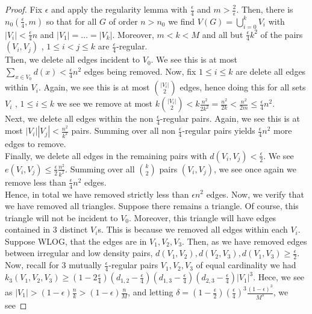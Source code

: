 \begin{proof}
	Fix \(\epsilon\) and apply the regularity lemma with \(\frac{\epsilon}{4}\) and \(m > \frac{2}{\epsilon}\). Then, there is \(n_0 \left( \frac{\epsilon}{4}, m \right) \) so that for all \(G\) of order \(n > n_0\)  we find \(V\left( G \right) = \bigcup_{i=0} ^{k} V_{i}\) with \(\left| V_{i} \right|< \frac{\epsilon}{4}n \) and \(\left| V_1 \right|  = \ldots = \left| V_{k} \right| \). Moreover, \(m < k < M\) and all but \(\frac{\epsilon}{4} k^2\) of the pairs \(\left( V_{i}, V_{j} \right) \) , \(1 \le i < j \le k\) are \(\frac{\epsilon}{4}\)-regular.\\
	Then, we delete all edges incident to \(V_0\). We see this is at most \(\sum_{x \in V_0}^{}d\left( x \right) < \frac{\epsilon}{4}n^2\) edges being removed. Now, fix \(1 \le i \le k\) are delete all edges within \(V_{i}\). Again, we see this is at most \( \binom{\left| V_{i} \right| }{2}\) edges, hence doing this for all sets \(V_{i}\) , \(1 \le i \le k\) we see we remove at most \(k \binom{\left| V_{i} \right| }{2} < k \frac{n^2}{2k^2} = \frac{n^2}{2k}< \frac{n^2}{2m} \le \frac{\epsilon}{4}n^2\).\\
Next, we delete all edges within the non \(\frac{\epsilon}{4}\)-regular pairs. Again, we see this is at most \(\left| V_{i} \right|\left| V_{j} \right| < \frac{n^2}{k^2}  \) pairs. Summing over all non \(\frac{\epsilon}{4}\)-regular pairs yields \(\frac{\epsilon}{4}n^2\) more edges to remove.\\
Finally, we delete all edges in the remaining pairs with \(d\left( V_{i}, V_{j} \right) < \frac{\epsilon}{2} \). We see \(e\left( V_{i}, V_{j} \right) \le \frac{\epsilon}{2} \frac{n^2}{k^2} \). Summing over all \(\binom{k}{2}\) pairs \(\left( V_{i}, V_{j} \right) \), we see once again we remove less than \(\frac{\epsilon}{4}n^2\) edges.\\
Hence, in total we have removed strictly less than \(\epsilon n^2\) edges. Now, we verify that we have removed all triangles. Suppose there remains a triangle. Of course, this triangle will not be incident to \(V_0\). Moreover, this triangle will have edges contained in \(3\) distinct \(V_{i}\)s. This is because we removed all edges within each \(V_{i}\). Suppose WLOG, that the edges are in \(V_1, V_2, V_3\). Then, as we have removed edges between irregular and low density pairs, \(d\left( V_1, V_2 \right) , d\left( V_2, V_3 \right) , d\left( V_1, V_3 \right) \ge \frac{\epsilon}{2}\).\\
Now, recall for \(3\) mutually \(\frac{\epsilon}{4}\)-regular pairs \(V_1, V_2, V_3\) of equal cardinality we had \(k_3\left( V_1, V_2, V_3 \right) \ge \left( 1 - 2 \frac{\epsilon}{4} \right) \left( d_{1,2} - \frac{\epsilon}{4} \right) \left( d_{1, 3} - \frac{\epsilon}{4} \right) \left( d_{2, 3} - \frac{\epsilon}{4} \right)\left| V_1 \right| ^3   \). Hece, we see as \(\left| V_1 \right| > \left( 1-\epsilon \right) \frac{n}{k} > \left( 1-\epsilon \right) \frac{n}{M}\), and letting \(\delta = \left( 1 - \frac{\epsilon}{2} \right) \left( \frac{\epsilon}{4} \right) ^3 \frac{\left( 1-\epsilon \right) ^3}{M^3}\), we see

\end{proof}
